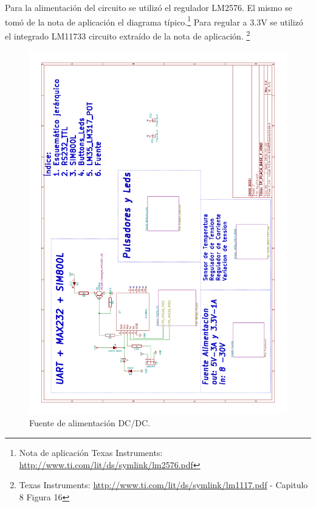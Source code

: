 Para la alimentación del circuito se utilizó el regulador LM2576. El mismo se tomó de la nota de aplicación el diagrama típico.\footnote{Nota de aplicación Texas Instruments: \url{http://www.ti.com/lit/ds/symlink/lm2576.pdf}}
Para regular a 3.3V se utilizó el integrado LM11733 circuito extraído de la nota de aplicación. \footnote{ Texas Instruments: \url{http://www.ti.com/lit/ds/symlink/lm1117.pdf} - Capitulo 8 Figura 16 } 
\begin{figure}[!htb]
  \centering
  \includegraphics[page=3,scale=0.3,angle=270]{./Figures/schematic.pdf}
  \caption{Fuente de alimentación DC/DC.}
  \label{fig:fuente}
\end{figure}

